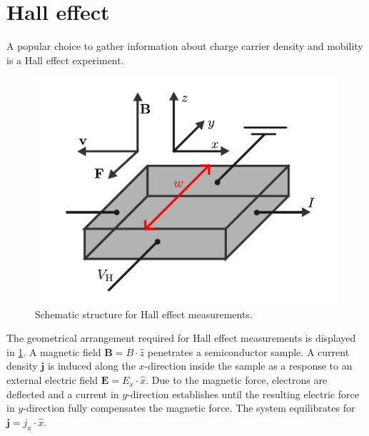 \section{Hall effect}
A popular choice to gather information about charge carrier density and mobility
is a Hall effect experiment.

\begin{figure}
	\centering
	\includegraphics{../assets/hall_geometry.pdf}
	\caption{Schematic structure for Hall effect measurements.
		}
	\label{fig:hall}
\end{figure}
The geometrical arrangement required for Hall effect measurements
is displayed in \cref{fig:hall}.
A magnetic field $\mathbf{B}=B \cdot \hat{z}$ penetrates
a semiconductor sample.
A current density $\mathbf{j}$ is induced along the $x$-direction inside the sample 
as a response to an external electric field $\mathbf{E}=E_x \cdot \hat{x}$.
Due to the magnetic force, electrons are deflected and a current in
$y$-direction establishes until the resulting electric force in $y$-direction
fully compensates the magnetic force.
The system equilibrates for $\mathbf{j} = j_x \cdot \hat{x}$.


